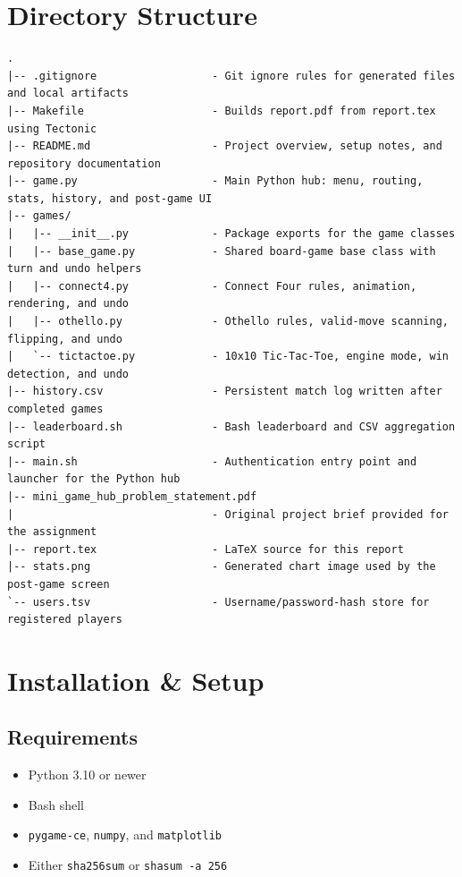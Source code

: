 \documentclass[12pt,a4paper]{article}
\begin{document}
\section{Directory Structure}

\begin{lstlisting}
.
|-- .gitignore                  - Git ignore rules for generated files and local artifacts
|-- Makefile                    - Builds report.pdf from report.tex using Tectonic
|-- README.md                   - Project overview, setup notes, and repository documentation
|-- game.py                     - Main Python hub: menu, routing, stats, history, and post-game UI
|-- games/
|   |-- __init__.py             - Package exports for the game classes
|   |-- base_game.py            - Shared board-game base class with turn and undo helpers
|   |-- connect4.py             - Connect Four rules, animation, rendering, and undo
|   |-- othello.py              - Othello rules, valid-move scanning, flipping, and undo
|   `-- tictactoe.py            - 10x10 Tic-Tac-Toe, engine mode, win detection, and undo
|-- history.csv                 - Persistent match log written after completed games
|-- leaderboard.sh              - Bash leaderboard and CSV aggregation script
|-- main.sh                     - Authentication entry point and launcher for the Python hub
|-- mini_game_hub_problem_statement.pdf
|                               - Original project brief provided for the assignment
|-- report.tex                  - LaTeX source for this report
|-- stats.png                   - Generated chart image used by the post-game screen
`-- users.tsv                   - Username/password-hash store for registered players
\end{lstlisting}

\section{Installation \& Setup}

\subsection{Requirements}

\begin{itemize}[leftmargin=*]
    \item Python 3.10 or newer
    \item Bash shell
    \item \texttt{pygame-ce}, \texttt{numpy}, and \texttt{matplotlib}
    \item Either \texttt{sha256sum} or \texttt{shasum -a 256}
\end{itemize}
\end{document}
